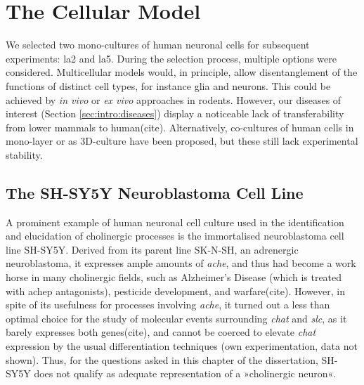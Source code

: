 \section{The Cellular Model}
We selected two mono-cultures of human neuronal cells for subsequent experiments: \acs{la2} and \acs{la5}. During the selection process, multiple options were considered. Multicellular models would, in principle, allow disentanglement of the functions of distinct cell types, for instance glia and neurons. This could be achieved by \emph{in vivo} or \emph{ex vivo} approaches in rodents. However, our diseases of interest (Section \ref{sec:intro:diseases}) display a noticeable lack of transferability from lower mammals to human(cite). Alternatively, co-cultures of human cells in mono-layer or as 3D-culture have been proposed, but these still lack experimental stability.

\subsection{The SH-SY5Y Neuroblastoma Cell Line}
A prominent example of human neuronal cell culture used in the identification and elucidation of cholinergic processes is the immortalised neuroblastoma cell line SH-SY5Y.\cite{Biedler1978} Derived from its parent line SK-N-SH, an adrenergic neuroblastoma,\cite{Biedler1973} it expresses ample amounts of \textit{\ac{ache}}, and thus had become a work horse in many cholinergic fields, such as Alzheimer's Disease (which is treated with \ac{achep} antagonists), pesticide development, and warfare(cite). However, in spite of its usefulness for processes involving \textit{\ac{ache}}, it turned out a less than optimal choice for the study of molecular events surrounding \textit{\ac{chat}} and \textit{\ac{slc}}, as it barely expresses both genes(cite), and cannot be coerced to elevate \textit{\ac{chat}} expression by the usual differentiation techniques (own experimentation, data not shown). Thus, for the questions asked in this chapter of the dissertation, SH-SY5Y does not qualify as adequate representation of a »cholinergic neuron«.

